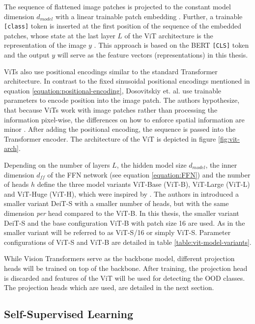 The sequence of flattened image patches is projected to the constant model dimension $d_{model}$ with a linear trainable patch embedding \citep{Dosovitskiy2020,Vaswani2017}.
Further, a trainable \texttt{[class]} token is inserted at the first position of the sequence of the embedded patches, whose state at the last layer $L$ of the ViT architecture is the representation of the image $y$ \citep{Dosovitskiy2020}.
This approach is based on the BERT \texttt{[CLS]} token \citep{Devlin2018} and the output $y$ will serve as the feature vectors (representations) in this thesis.
\par
ViTs also use positional encodings similar to the standard Transformer architecture.
In contrast to the fixed sinusoidal positional encodings mentioned in equation \ref{equation:positional-encoding}, Dosovitskiy et. al. \citep{Dosovitskiy2020} use trainable parameters to encode position into the image patch.
The authors hypothesize, that because ViTs work with image patches rather than processing the information pixel-wise, the differences on how to enforce spatial information are minor \citep{Dosovitskiy2020}.
After adding the positional encoding, the sequence is passed into the Transformer encoder.
The architecture of the ViT is depicted in figure \ref{fig:vit-arch}.
\par
Depending on the number of layers $L$, the hidden model size $d_{model}$, the inner dimension $d_{ff}$ of the FFN network (see equation \ref{equation:FFN}) and the number of heads $h$ \citep{Dosovitskiy2020} define the three model variants ViT-Base (ViT-B), ViT-Large (ViT-L) and ViT-Huge (ViT-H), which were inspired by \citep{Devlin2018}.
The authors in \citep{Touvron2020} introduced a smaller variant DeiT-S with a smaller number of heads, but with the same dimension \textit{per} head compared to the ViT-B.
In this thesis, the smaller variant DeiT-S \citep{Touvron2020} and the base configuration ViT-B with patch size 16 are used.
As in \citep{Caron2021} the smaller variant will be referred to as ViT-S/16 or simply ViT-S.
Parameter configurations of ViT-S and ViT-B are detailed in table \ref{table:vit-model-variants}.
\par
While Vision Transformers serve as the backbone model, different projection heads will be trained on top of the backbone. 
After training, the projection head is discarded and features of the ViT will be used for detecting the OOD classes.
The projection heads which are used, are detailed in the next section.
\subsection{Self-Supervised Learning}
